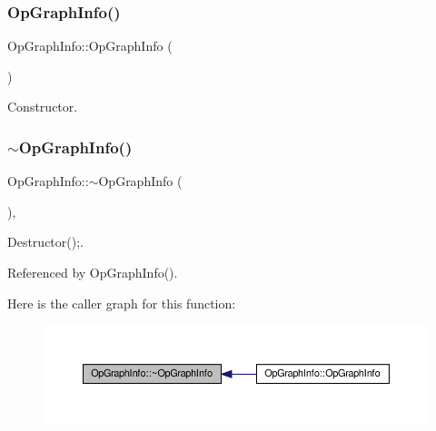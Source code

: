 \subsubsection{\texorpdfstring{Op\+Graph\+Info()}{OpGraphInfo()}\hspace{0.1cm}{\footnotesize\ttfamily [1/2]}}
{\footnotesize\ttfamily Op\+Graph\+Info\+::\+Op\+Graph\+Info (\begin{DoxyParamCaption}{ }\end{DoxyParamCaption})}



Constructor. 

\mbox{\label{structOpGraphInfo_a70065ddfbdf5f2433ac3f6e3ee309883}} 
\subsubsection{\texorpdfstring{$\sim$\+Op\+Graph\+Info()}{~OpGraphInfo()}}
{\footnotesize\ttfamily Op\+Graph\+Info\+::$\sim$\+Op\+Graph\+Info (\begin{DoxyParamCaption}{ }\end{DoxyParamCaption})\hspace{0.3cm}{\ttfamily [override]}, {\ttfamily [default]}}



Destructor();. 



Referenced by Op\+Graph\+Info().

Here is the caller graph for this function\+:
\nopagebreak
\begin{figure}[H]
\begin{center}
\leavevmode
\includegraphics[width=350pt]{d8/daf/structOpGraphInfo_a70065ddfbdf5f2433ac3f6e3ee309883_icgraph}
\end{center}
\end{figure}
\mbox{\label{structOpGraphInfo_a83c3941334a7d0e4ebaeaae6d35bd868}} 
